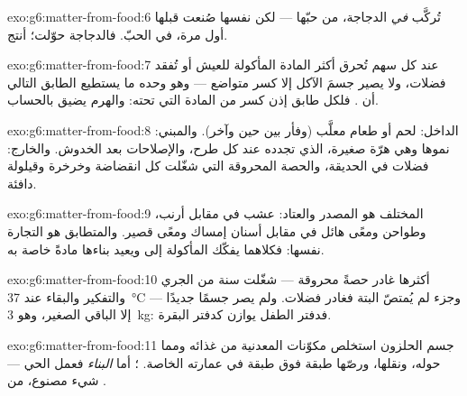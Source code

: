 \begin{solution}{exo:g6:matter-from-food:6}
تُركَّب \emph{في} الدجاجة، من  حبّها --- لكن 
نفسها صُنعت قبلها أول مرة، في   الحبّ. فالدجاجة حوّلت؛
 أنتج.
\end{solution}

\begin{solution}{exo:g6:matter-from-food:7}
عند كل سهم تُحرق أكثر المادة المأكولة للعيش أو تُفقد فضلات، ولا
يصير جسمَ الآكل إلا كسر متواضع --- وهو وحده ما يستطيع الطابق
التالي أن . فلكل طابق إذن كسر من المادة التي تحته: والهرم
يضيق بالحساب.
\end{solution}

\begin{solution}{exo:g6:matter-from-food:8}
الداخل: لحم أو طعام معلَّب (وفأر بين حين وآخر). والمبني: نموها وهي
هرّة صغيرة،  الذي تجدده عند كل طرح، والإصلاحات بعد الخدوش.
والخارج: فضلات في الحديقة، والحصة المحروقة التي شغّلت كل انقضاضة
وخرخرة وقيلولة دافئة.
\end{solution}

\begin{solution}{exo:g6:matter-from-food:9}
المختلف هو المصدر والعتاد: عشب في مقابل أرنب، وطواحن ومعًى هائل في
مقابل أسنان إمساك ومعًى قصير. والمتطابق هو التجارة نفسها: فكلاهما
يفكّك  المأكولة إلى  ويعيد بناءها مادةً خاصة
به.
\end{solution}

\begin{solution}{exo:g6:matter-from-food:10}
أكثرها غادر حصةً محروقة --- شغّلت سنة من الجري والتفكير والبقاء
عند \qty{37}{\degreeCelsius} --- وجزء لم يُمتصّ البتة فغادر
فضلات. ولم يصر جسمًا جديدًا إلا الباقي الصغير، وهو
\qty{3}{kg}: فدفتر الطفل يوازن كدفتر البقرة.
\end{solution}

\begin{solution}{exo:g6:matter-from-food:11}
جسم الحلزون استخلص مكوّنات  المعدنية من غذائه ومما حوله،
ونقلها، ورصّها طبقة فوق طبقة في عمارته الخاصة. ؛
أما \emph{البناء} فعمل  الحي --- شيء مصنوع، من .
\end{solution}

